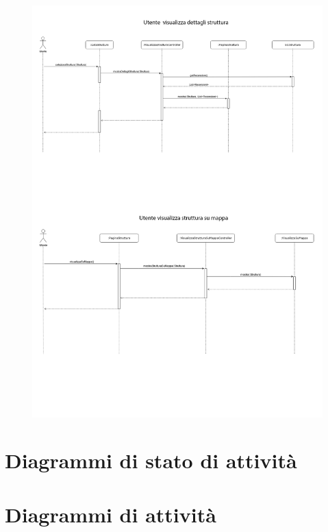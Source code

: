 \begin{figure}[h!]
    \includegraphics[width=\textwidth]{SequenceAnalisi/6.png}
\end{figure}
\section{Diagrammi di stato di attività}


\section{Diagrammi di attività}


